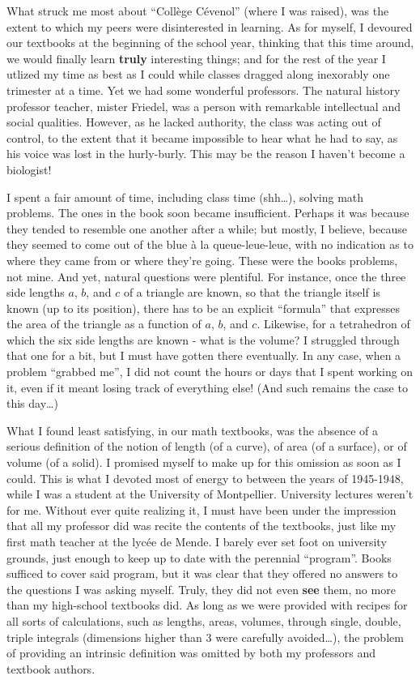 What struck me most about
``Coll\`ege C\'evenol'' (where I was raised), was the extent to which my peers were
disinterested in learning. As for myself, I devoured our textbooks at the beginning of the
school year, thinking that this time around, we would finally learn \textbf{truly}
interesting things; and for 
the rest of the year I utlized my time as best as I could while classes dragged along
inexorably one trimester at a time. Yet we had some wonderful professors. The natural
history professor teacher, mister Friedel, was a person with remarkable intellectual and
social qualities. However, as he lacked authority, the class was acting out of control, to
the extent that it became impossible to hear what he had to say, as his voice was lost in
the hurly-burly. This may be the reason I haven't become a biologist! 


I spent a fair amount of time, including class time (shh\ldots), solving math problems.
The ones in the book soon became insufficient. Perhaps it was because they tended to
resemble one another after a while; but mostly, I believe, because they seemed
to come out of the blue \`a la queue-leue-leue,
with no indication as to where they came from or where they're going.
These were the books problems, not mine. And yet, natural questions were plentiful. For
instance, once the three side lengths $a$, $b$, and $c$ of a triangle are known, so that the
triangle itself is known (up to its position), there has to be an explicit ``formula''
that expresses the area of the triangle as a function of $a$, $b$, and $c$. Likewise, for
a tetrahedron of which the six side lengths are known - what is the volume? I struggled
through that one for a bit, but I must have gotten there eventually. In any case, when a
problem ``grabbed me'', I did not count the hours or days that I spent working on it, 
even if it meant losing track of everything else! (And such remains the case to this
day\ldots)

What I found least satisfying, in our math textbooks, was the absence of 
a serious definition of the notion of length (of a curve), of area (of a surface), or of
volume (of a solid). I promised myself to make up for this omission as soon as I could. 
This is what I devoted most of energy to between the years of 1945-1948, while I was a
student at the University of Montpellier. University lectures weren't for me. Without ever
quite realizing it, 
I must have been under the impression 
that all my professor did was recite the contents
of the textbooks, just like my first math teacher at the lyc\'ee de Mende.
I barely ever set foot on university grounds, just enough to keep up to date with 
the perennial ``program''. Books sufficed to cover said program, but it was clear that
they offered no answers to the questions I was asking myself. Truly, they did not even
\textbf{see} them, no more than my high-school textbooks did. As long as we were provided
with recipes for all sorts of calculations, such as lengths, areas, volumes, through single,
double, triple integrals (dimensions higher than 3 were carefully avoided\ldots), the
problem of providing an intrinsic definition was omitted by both my professors and
textbook authors. 

